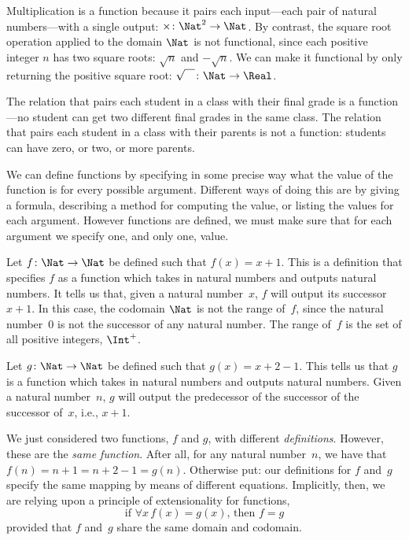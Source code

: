\documentclass[../../../include/open-logic-section]{subfiles}
\begin{document}
\begin{ex}
Multiplication is a function because it pairs each input---each pair
of natural numbers---with a single output: $\times \colon \Nat^2 \to
\Nat$. By contrast, the square root operation applied to the domain
$\Nat$ is not functional, since each positive integer $n$ has two
square roots: $\sqrt{n}$ and $-\sqrt{n}$. We can make it functional by
only returning the positive square root: $\sqrt{\phantom{X}} \colon
\Nat \to \Real$. 
\end{ex}

\begin{ex}
The relation that pairs each student in a class with their final grade
is a function---no student can get two different final grades in the
same class. The relation that pairs each student in a class with their
parents is not a function: students can have zero, or two, or more
parents.
\end{ex}

\begin{explain}
We can define functions by specifying in some precise way what the
value of the function is for every possible argument. Different ways of
doing this are by giving a formula, describing a method for computing
the value, or listing the values for each argument. However functions
are defined, we must make sure that for each argument we specify one,
and only one, value.
\end{explain}


\begin{ex}
Let $f \colon \Nat \to \Nat$ be defined such that $f(x) = x+1$. This
is a definition that specifies $f$ as a function which takes in
natural numbers and outputs natural numbers. It tells us that, given a
natural number~$x$, $f$ will output its successor~$x+1$.
In this case, the codomain $\Nat$ is not the range of~$f$, since the
natural number~$0$ is not the successor of any natural number. The
range of~$f$ is the set of all positive integers, $\Int^{+}$.
\end{ex}

\begin{ex}
Let $g \colon \Nat \to \Nat$ be defined such that $g(x) = x+2-1$. This
tells us that $g$ is a function which takes in natural numbers and
outputs natural numbers. Given a natural number~$n$, $g$ will output
the predecessor of the successor of the successor of~$x$, i.e.,
$x+1$.
\end{ex}

\begin{explain}
We just considered two functions, $f$ and $g$, with different
\emph{definitions}. However, these are the \emph{same function}. After
all, for any natural number~$n$, we have that $f(n) = n+1 = n+2-1 =
g(n)$. Otherwise put: our  definitions for $f$ and~$g$ specify the
same mapping by means of different equations. Implicitly, then, we are
relying upon a principle of extensionality for functions, 
\[
  \text{if }\forall x\, f(x) = g(x)\text{, then }f = g
\]
provided that $f$ and~$g$ share the same domain and codomain.
\end{explain}
\end{document}
